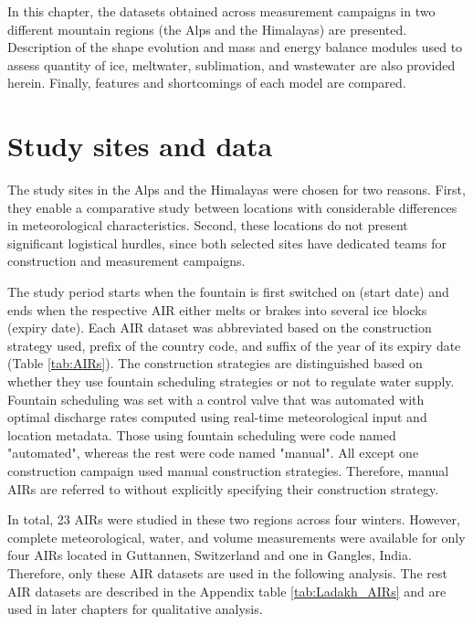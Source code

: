 In this chapter, the datasets obtained across measurement campaigns in two different mountain regions (the Alps
and the Himalayas) are presented. Description of the shape evolution and mass and energy balance modules used to
assess quantity of ice, meltwater, sublimation, and wastewater are also provided herein. Finally, features and
shortcomings of each model are compared.

\section{Study sites and data}

The study sites in the Alps and the Himalayas were chosen for two reasons. First, they enable a comparative
study between locations with considerable differences in meteorological characteristics. Second, these locations
do not present significant logistical hurdles, since both selected sites have dedicated teams for construction
and measurement campaigns.

The study period starts when the fountain is first switched on (start date) and ends when the respective
\ac{AIR} either melts or brakes into several ice blocks (expiry date). Each \ac{AIR} dataset was abbreviated
based on the construction strategy used, prefix of the country code, and suffix of the year of its expiry date
(Table \ref{tab:AIRs}). The construction strategies are distinguished based on whether they use fountain
scheduling strategies or not to regulate water supply. Fountain scheduling was set with a control valve that was
automated with optimal discharge rates computed using real-time meteorological input and location metadata.
Those using fountain scheduling were code named "automated", whereas the rest were code named "manual". All
except one construction campaign used manual construction strategies. Therefore, manual \ac{AIRs} are referred
to without explicitly specifying their construction strategy.

In total, 23 \ac{AIRs} were studied in these two regions across four winters. However, complete meteorological,
water, and volume measurements were available for only four \ac{AIRs} located in Guttannen, Switzerland and one
in Gangles, India. Therefore, only these \ac{AIR} datasets are used in the following analysis. The rest \ac{AIR}
datasets are described in the Appendix table \ref{tab:Ladakh_AIRs} and are used in later chapters for
qualitative analysis.

